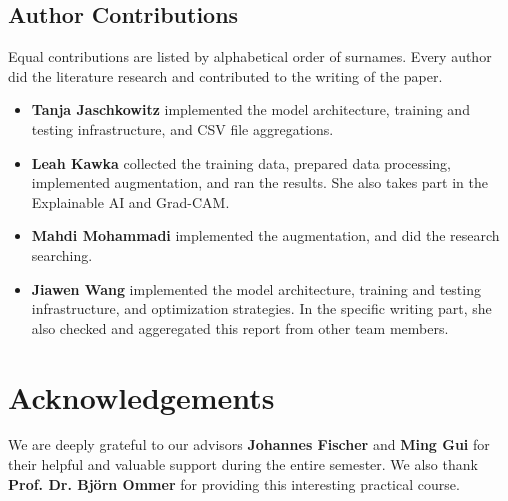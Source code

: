 \subsection*{Author Contributions}
\label{sec:author}
Equal contributions are listed by alphabetical order of surnames. 
Every author did the literature research and contributed to the writing of the paper. 

\begin{itemize}
  \item \textbf{Tanja Jaschkowitz} implemented the model architecture, training and testing infrastructure, and CSV file aggregations. 
  \item \textbf{Leah Kawka} collected the training data, prepared data processing, implemented augmentation, and ran the results. 
  She also takes part in the Explainable AI and Grad-CAM.
  \item \textbf{Mahdi Mohammadi} implemented the augmentation, and did the research searching. 
  \item \textbf{Jiawen Wang} implemented the model architecture, training and testing infrastructure, and optimization strategies. 
  In the specific writing part, she also checked and aggeregated this report from other team members.
\end{itemize}

\section*{Acknowledgements}

We are deeply grateful to our advisors \textbf{Johannes Fischer} and \textbf{Ming Gui} for their helpful and valuable support during the entire semester. 
We also thank \textbf{Prof. Dr. Björn Ommer} for providing this interesting practical course.